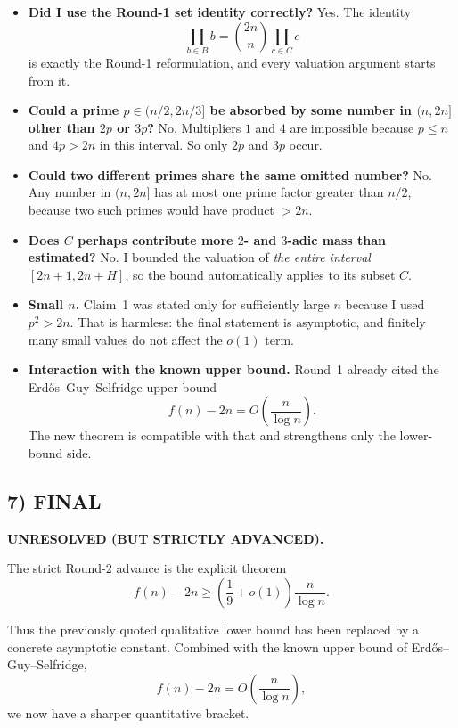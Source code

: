 \begin{itemize}
\item \textbf{Did I use the Round-1 set identity correctly?}
Yes.  The identity
\[
\prod_{b\in B} b={2n\choose n}\prod_{c\in C} c
\]
is exactly the Round-1 reformulation, and every valuation argument starts from it.

\item \textbf{Could a prime $p\in(n/2,2n/3]$ be absorbed by some number in $(n,2n]$ other than $2p$ or $3p$?}
No.  Multipliers $1$ and $4$ are impossible because $p\le n$ and $4p>2n$ in this interval.  So only $2p$ and $3p$ occur.

\item \textbf{Could two different primes share the same omitted number?}
No.  Any number in $(n,2n]$ has at most one prime factor greater than $n/2$, because two such primes would have product $>2n$.

\item \textbf{Does $C$ perhaps contribute more $2$- and $3$-adic mass than estimated?}
No.  I bounded the valuation of \emph{the entire interval} $[2n+1,2n+H]$, so the bound automatically applies to its subset $C$.

\item \textbf{Small $n$.}
Claim~1 was stated only for sufficiently large $n$ because I used $p^2>2n$.
That is harmless: the final statement is asymptotic, and finitely many small values do not affect the $o(1)$ term.

\item \textbf{Interaction with the known upper bound.}
Round~1 already cited the Erd\H{o}s--Guy--Selfridge upper bound
\[
f(n)-2n=O\!\left(\frac{n}{\log n}\right).
\]
The new theorem is compatible with that and strengthens only the lower-bound side.
\end{itemize}

\subsection*{7) FINAL}

\textbf{UNRESOLVED (BUT STRICTLY ADVANCED).}

The strict Round-2 advance is the explicit theorem
\[
f(n)-2n\ge \left(\frac{1}{9}+o(1)\right)\frac{n}{\log n}.
\]

Thus the previously quoted qualitative lower bound has been replaced by a concrete asymptotic constant.
Combined with the known upper bound of Erd\H{o}s--Guy--Selfridge,
\[
f(n)-2n=O\!\left(\frac{n}{\log n}\right),
\]
we now have a sharper quantitative bracket.

